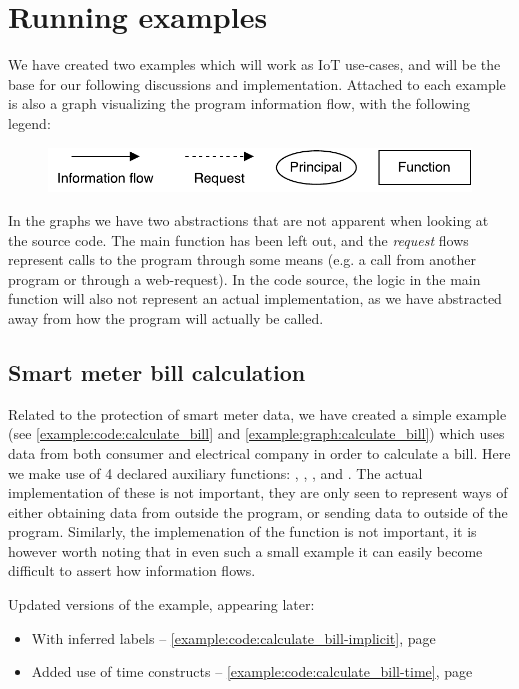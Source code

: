 
\section{Running examples}\label{examples:sec}
We have created two examples which will work as IoT use-cases, and will be the base for our following discussions and implementation.
Attached to each example is also a graph visualizing the program information flow, with the following legend:
\begin{figure}[H]
  \centering
  \includegraphics[scale=0.8]{figures/dlm_legend}
\end{figure}
In the graphs we have two abstractions that are not apparent when looking at the source code.
The main function has been left out, and the \emph{request} flows represent calls to the program through some means (e.g. a call from another program or through a web-request).
In the code source, the logic in the main function will also not represent an actual implementation, as we have abstracted away from how the program will actually be called.

\subsection{Smart meter bill calculation}
Related to the protection of smart meter data, we have created a simple example (see \cref{example:code:calculate_bill} and \cref{example:graph:calculate_bill}) which uses data from both consumer and electrical company in order to calculate a bill.
Here we make use of 4 declared auxiliary functions: , , , and .
The actual implementation of these is not important, they are only seen to represent ways of either obtaining data from outside the program, or sending data to outside of the program.
Similarly, the implemenation of the  function is not important, it is however worth noting that in even such a small example it can easily become difficult to assert how information flows.

Updated versions of the example, appearing later:
\begin{itemize}
  \item With inferred labels -- \cref{example:code:calculate_bill-implicit}, page \pageref{example:code:calculate_bill-implicit}
  \item Added use of time constructs -- \cref{example:code:calculate_bill-time}, page \pageref{example:code:calculate_bill-time}
\end{itemize}

